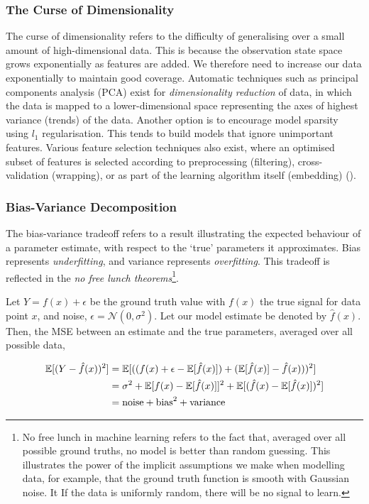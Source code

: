 \documentclass[11pt]{amsart}
\begin{document}
\subsubsection{The Curse of Dimensionality}
The curse of dimensionality refers to the difficulty of generalising over a small amount of high-dimensional data. This is because the observation state space grows exponentially as features are added. We therefore need to increase our data exponentially to maintain good coverage. Automatic techniques such as principal components analysis (PCA) exist for \emph{dimensionality reduction} of data, in which the data is mapped to a lower-dimensional space representing the axes of highest variance (trends) of the data. Another option is to encourage model sparsity using $l_1$ regularisation. This tends to build models that ignore unimportant features. Various 
feature selection techniques also exist, where an optimised subset of features is selected according to preprocessing (filtering), cross-validation (wrapping), or as part of the learning algorithm itself (embedding) (\cite{transfersurvey}).

\subsubsection{Bias-Variance Decomposition}
The bias-variance tradeoff refers to a result illustrating the expected behaviour of a parameter estimate, with respect to the `true' parameters it approximates. Bias represents \emph{underfitting}, and variance represents \emph{overfitting}. This tradeoff is reflected in the \emph{no free lunch theorems}\footnote{No free lunch in machine learning refers to the fact that, averaged over all possible ground truths, no model is better than random guessing. This illustrates the power of the implicit assumptions we make when modelling data, for example, that the ground truth function is smooth with Gaussian noise. It  If the data is uniformly random, there will be no signal to learn.}.

 Let $Y = f(x) + \epsilon$ be the ground truth value with $f(x)$ the true signal for data point $x$, and noise, $\epsilon = \mathcal{N}(0, \sigma^2)$. Let our model estimate be denoted by $\hat{f}(x)$. Then, the MSE between an estimate and the true parameters, averaged over all possible data,

\begin{align}
\mathbb{E}[(Y - \hat{f}(x))^2] &= \mathbb{E}[((f(x) + \epsilon - \mathbb{E}[\hat{f}(x)]) + (\mathbb{E}[\hat{f}(x)] - \hat{f}(x)))^2] \notag \\
&= \sigma^2 + \mathbb{E}[f(x) - \mathbb{E}[\hat{f}(x)]]^2 + \mathbb{E}[(\hat{f}(x) - \mathbb{E}[\hat{f}(x)])^2] \notag \\
&= \text{noise} + \text{bias}^2 + \text{variance} \notag
\end{align}
\end{document}
